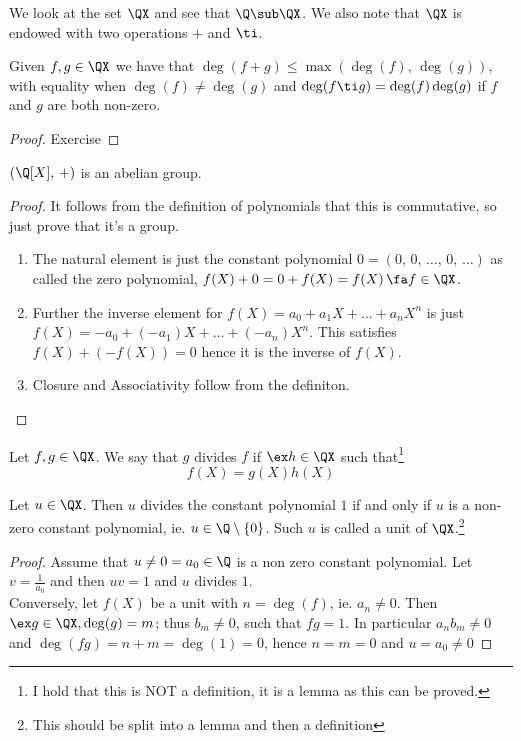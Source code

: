 We look at the set $\QX$ and see that $\Q\sub\QX$. We also note that $\QX$ is endowed with two operations $+$ and $\ti$.

\begin{nlemma}
  Given $f, g\in \QX$ we have that $\deg(f + g) \le \max(\deg(f),\,\deg(g))$, with equality when $\deg(f) \ne \deg(g)$ and $\deg(f \ti g) = \deg(f)\deg(g)$ if $f$ and $g$ are both non-zero.
\end{nlemma}
\begin{proof}
  Exercise
\end{proof}

\begin{nprop}
  $(\Q[X],\,+)$ is an abelian group.
\end{nprop}
\begin{proof}
  It follows from the definition of polynomials that this is commutative, so just prove that it's a group.
  \begin{enumerate}
    \item The natural element is just the constant polynomial $0 = (0,\,0,\,\dots,\,0,\,\dots)$ as called the zero polynomial, $f(X) + 0 = 0 + f(X) = f(X)\, \fa f \in \QX$.
    \item Further the inverse element for $f(X) = a_0 + a_1X + \dots + a_nX^n$ is just $f(X) = -a_0 + (-a_1)X + \dots + (-a_n)X^n$. This satisfies $f(X) + (-f(X)) = 0$ hence it is the inverse of $f(X)$.
    \item Closure and Associativity follow from the definiton.
  \end{enumerate}
\end{proof}

\begin{ndefi}[Division]
  Let $f, g \in \QX$. We say that $g$ divides $f$ if $\ex h \in \QX$ such that\footnote{I hold that this is NOT a definition, it is a lemma as this can be proved.}
  $$ f(X) = g(X)h(X) $$
\end{ndefi}

\begin{nlemma}
  Let $u \in \QX$. Then $u$ divides the constant polynomial $1$ if and only if $u$ is a non-zero constant polynomial, ie. $u \in \Q \setminus \{0\}$. Such $u$ is called a unit of $\QX$.\footnote{This should be split into a lemma and then a definition}
\end{nlemma}
\begin{proof}
  Assume that $u \ne 0 = a_0 \in \Q$ is a non zero constant polynomial. Let $v = \frac{1}{a_0}$ and then $uv = 1$ and $u$ divides $1$.\\
  Conversely, let $f(X)$ be a unit with $n = \deg(f)$, ie. $a_n \ne 0$. Then $\ex g \in \QX, \deg(g) = m$; thus $b_m \ne 0$, such that $fg = 1$.  In particular $a_nb_m \ne 0$ and $\deg(fg) = n + m = \deg(1) = 0$, hence $n = m = 0$ and $u = a_0 \ne 0$
\end{proof}

